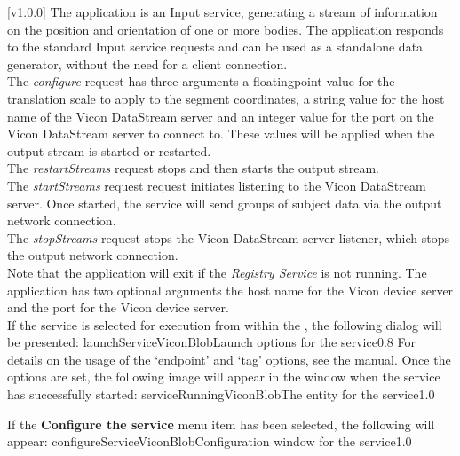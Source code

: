 [v1.0.0]
The  application is an Input service,
generating a stream of information on the position and orientation of one or more bodies.
The application responds to the standard Input service requests and can be used as a
standalone data generator, without the need for a client connection.\\

The \emph{configure} request has three arguments \longDash{} a floating\longDash{}point
value for the translation scale to apply to the segment coordinates, a string value for
the host name of the Vicon DataStream server and an integer value for the port on the
Vicon DataStream server to connect to.
These values will be applied when the output stream is started or restarted.\\ 

The \emph{restartStreams} request stops and then starts the output stream.\\

The \emph{startStreams} request request initiates listening to the Vicon DataStream
server.
Once started, the service will send groups of subject data via the output \yarp{} network
connection.\\

The \emph{stopStreams} request stops the Vicon DataStream server listener, which stops the
output \yarp{} network connection.\\ 

Note that the application will exit if the \emph{Registry Service} is not running.
The application has two optional arguments \longDash{} the host name for the Vicon device
server and the port for the Vicon device server.
\insertAppParameters
\insertTagDescription{\VDSI}
\insertInputServiceComment\\

\insertStandardServiceCommands
\secondaryEnd
{}
If the service is selected for execution from within the \emph{\MMMU}, the following
dialog will be presented:
%
{launchServiceViconBlob}{Launch options for the \VBI{} service}{0.8}
\condPage{}
For details on the usage of the `endpoint' and `tag' options, see the \emph{\MMMU} manual.
Once the options are set, the following image will appear in the \emph{\MMMU} window when
the service has successfully started:
%
{serviceRunningViconBlob}{The \emph{\MMMU} entity for the \VBI{} service}{1.0}

If the \textbf{Configure the service} menu item has been selected, the following will
appear:
%
{configureServiceViconBlob}{Configuration window for the \emph{\VBI} service}{1.0}
\secondaryEnd
\primaryEnd{}

